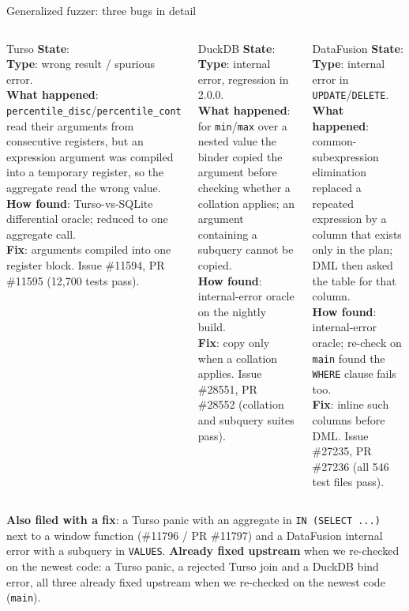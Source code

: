 \documentclass[aspectratio=169,10pt]{beamer}
\begin{document}
\begin{frame}{Generalized fuzzer: three bugs in detail}
\scriptsize
\begin{columns}[T]
\begin{block}{Turso}
\textbf{State}: \\[2pt]
\textbf{Type}: wrong result / spurious error.\\[2pt]
\textbf{What happened}: \texttt{percentile\_disc}/\texttt{percentile\_cont} read their arguments from consecutive registers, but an expression argument was compiled into a temporary register, so the aggregate read the wrong value.\\[2pt]
\textbf{How found}: Turso-vs-SQLite differential oracle; reduced to one aggregate call.\\[2pt]
\textbf{Fix}: arguments compiled into one register block. Issue \#11594, PR \#11595 (12{,}700 tests pass).
\end{block}
\begin{block}{DuckDB}
\textbf{State}: \\[2pt]
\textbf{Type}: internal error, regression in 2.0.0.\\[2pt]
\textbf{What happened}: for \texttt{min}/\texttt{max} over a nested value the binder copied the argument before checking whether a collation applies; an argument containing a subquery cannot be copied.\\[2pt]
\textbf{How found}: internal-error oracle on the nightly build.\\[2pt]
\textbf{Fix}: copy only when a collation applies. Issue \#28551, PR \#28552 (collation and subquery suites pass).
\end{block}
\begin{block}{DataFusion}
\textbf{State}: \\[2pt]
\textbf{Type}: internal error in \texttt{UPDATE}/\texttt{DELETE}.\\[2pt]
\textbf{What happened}: common-subexpression elimination replaced a repeated expression by a column that exists only in the plan; DML then asked the table for that column.\\[2pt]
\textbf{How found}: internal-error oracle; re-check on \texttt{main} found the \texttt{WHERE} clause fails too.\\[2pt]
\textbf{Fix}: inline such columns before DML. Issue \#27235, PR \#27236 (all 546 test files pass).
\end{block}
\end{columns}
\smallskip
\scriptsize \textbf{Also filed with a fix}: a Turso panic with an aggregate in \texttt{IN (SELECT ...)} next to a window function (\#11796 / PR \#11797) and a DataFusion internal error with a subquery in \texttt{VALUES}. \textbf{Already fixed upstream} when we re-checked on the newest code: a Turso panic, a rejected Turso join and a DuckDB bind error, all three already fixed upstream when we re-checked on the newest code (\texttt{main}).
\end{frame}
\end{document}
